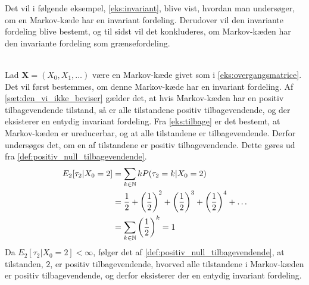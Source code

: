 Det vil i følgende eksempel, \autoref{eks:invariant}, blive vist, hvordan man undersøger, om en Markov-kæde har en invariant fordeling. Derudover vil den invariante fordeling blive bestemt, og til sidst vil det konkluderes, om Markov-kæden har den invariante fordeling som grænsefordeling.

\begin{eks}\textbf{}\label{eks:invariant}\\
Lad $\bm X = (X_0, X_1, \ldots)$ være en Markov-kæde givet som i \autoref{eks:overgangsmatrice}. Det vil først bestemmes, om denne Markov-kæde har en invariant fordeling. Af \autoref{sæt:den_vi_ikke_beviser} gælder det, at hvis Markov-kæden har en positiv tilbagevendende tilstand, så er alle tilstandene positiv tilbagevendende, og der eksisterer en entydig invariant fordeling. Fra \autoref{eks:tilbage} er det bestemt, at Markov-kæden er ureducerbar, og at alle tilstandene er tilbagevendende. Derfor undersøges det, om en af tilstandene er positiv tilbagevendende. Dette gøres ud fra \autoref{def:positiv_null_tilbagevendende}.
\begin{align*}
    E_2[\tau_2| X_0 = 2]&=\sum_{k\in \mathbb{N}} kP(\tau_2=k|X_0=2)\\
    &=\frac{1}{2} + \left(\frac{1}{2}\right)^2 + \left(\frac{1}{2}\right)^3 + \left(\frac{1}{2}\right)^4 + \ldots\\
    &= \sum_{k \in \mathbb{N}} \left(\frac{1}{2}\right)^k = 1
\end{align*}
Da $ E_2[\tau_2 | X_0 = 2]<\infty$, følger det af \autoref{def:positiv_null_tilbagevendende}, at tilstanden, $2$, er positiv tilbagevendende, hvorved alle tilstandene i Markov-kæden er positiv tilbagevendende, og derfor eksisterer der en entydig invariant fordeling.


\end{eks}

